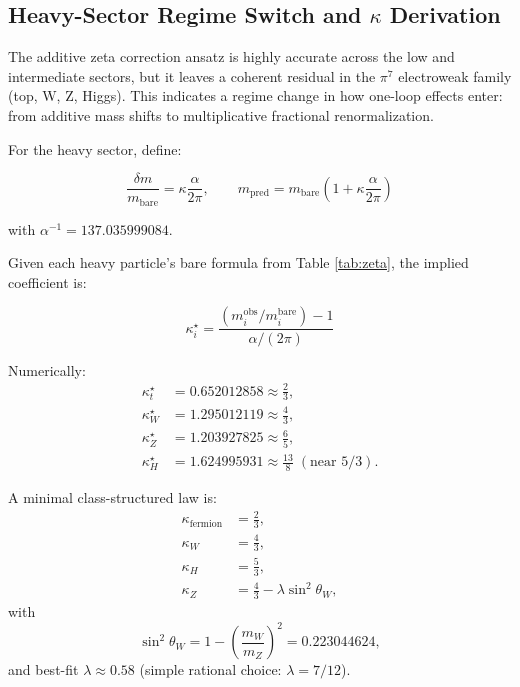 \subsection{Heavy-Sector Regime Switch and $\kappa$ Derivation}

The additive zeta correction ansatz is highly accurate across the low and intermediate sectors, but it leaves a coherent residual in the $\pi^7$ electroweak family (top, W, Z, Higgs). This indicates a regime change in how one-loop effects enter: from additive mass shifts to multiplicative fractional renormalization.

For the heavy sector, define:

$$\frac{\delta m}{m_{\mathrm{bare}}} = \kappa \frac{\alpha}{2\pi}, \qquad
m_{\mathrm{pred}} = m_{\mathrm{bare}} \left(1 + \kappa \frac{\alpha}{2\pi}\right)$$

with $\alpha^{-1} = 137.035999084$.

Given each heavy particle's bare formula from Table \ref{tab:zeta}, the implied coefficient is:

$$\kappa^\star_i = \frac{\left(m_i^{\mathrm{obs}}/m_i^{\mathrm{bare}}\right)-1}{\alpha/(2\pi)}$$

Numerically:
\begin{align*}
\kappa^\star_t &= 0.652012858 \approx \frac{2}{3},\\
\kappa^\star_W &= 1.295012119 \approx \frac{4}{3},\\
\kappa^\star_Z &= 1.203927825 \approx \frac{6}{5},\\
\kappa^\star_H &= 1.624995931 \approx \frac{13}{8}\; (\text{near } 5/3).
\end{align*}

A minimal class-structured law is:
\begin{align*}
\kappa_{\mathrm{fermion}} &= \frac{2}{3},\\
\kappa_W &= \frac{4}{3},\\
\kappa_H &= \frac{5}{3},\\
\kappa_Z &= \frac{4}{3} - \lambda \sin^2\theta_W,
\end{align*}
with
$$\sin^2\theta_W = 1 - \left(\frac{m_W}{m_Z}\right)^2 = 0.223044624,$$
and best-fit $\lambda \approx 0.58$ (simple rational choice: $\lambda = 7/12$).

\begin{center}
\end{center}

